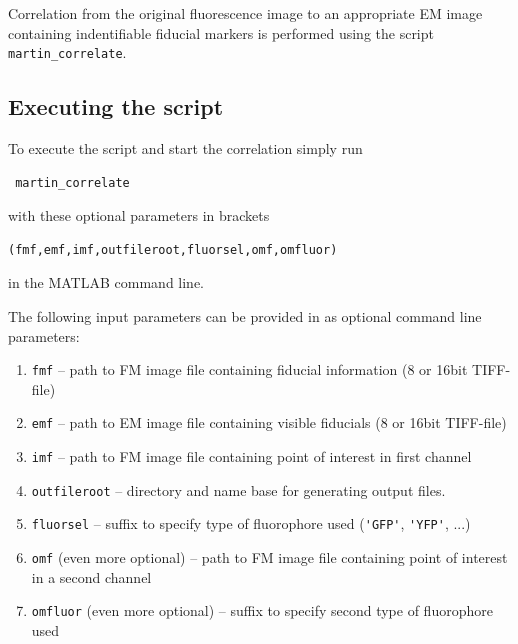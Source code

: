 \documentclass[10pt,a4paper,onepage,DIV12]{scrartcl}
\begin{document}
Correlation from the original fluorescence image to an appropriate EM image containing indentifiable fiducial markers is performed using the script \texttt{martin\_correlate}.

\subsection{Executing the script}
To execute the script and start the correlation simply run \begin{verbatim}
 martin_correlate\end{verbatim} with these optional parameters in brackets \begin{verbatim}(fmf,emf,imf,outfileroot,fluorsel,omf,omfluor)
\end{verbatim}
 in the MATLAB command line.
 
The following input parameters can be provided in as optional command line parameters:
\begin{enumerate}
 \item\texttt{fmf} -- path to FM image file containing fiducial information (8 or 16bit TIFF-file)
 \item\texttt{emf} -- path to EM image file containing visible fiducials (8 or 16bit TIFF-file)
 \item\texttt{imf} -- path to FM image file containing point of interest in first channel
 \item\texttt{outfileroot} -- directory and name base for generating output files.
 \item\texttt{fluorsel} -- suffix to specify type of fluorophore used (\verb|'GFP'|, \verb|'YFP'|, ...)
 \item\texttt{omf} (even more optional) -- path to FM image file containing point of interest in a second channel
 \item\texttt{omfluor} (even more optional) -- suffix to specify second type of fluorophore used
\end{enumerate}
\newpage
\end{document}

